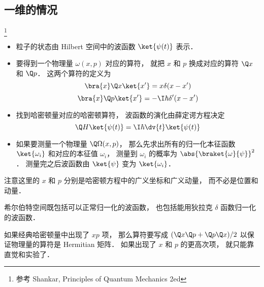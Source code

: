 


\subsection{一维的情况}
\footnote{参考 Shankar, Principles of Quantum Mechanics 2ed}

\begin{itemize}
\item 粒子的状态由 Hilbert 空间中的波函数 $\ket{\psi(t)}$ 表示．
\item 要得到一个物理量 $\omega(x, p)$ 对应的算符， 就把 $x$ 和 $p$ 换成对应的算符 $\Q x$ 和 $\Q p$． 这两个算符的定义为
\begin{equation}
\bra{x}\Q x \ket{x'} = x\delta(x-x')
\end{equation}
\begin{equation}
\bra{x}\Q p \ket{x'} = -\I\hbar \delta'(x-x')
\end{equation}
\item 找到哈密顿量对应的哈密顿算符， 波函数的演化由薛定谔方程决定
\begin{equation}
\Q H \ket{\psi(t)} = \I \hbar \dv{t} \ket{\psi(t)}
\end{equation}
\item 如果要测量一个物理量 $\Q\Omega(x, p)$， 那么先求出所有的归一化本征函数 $\ket{\omega_i}$ 和对应的本征值 $\omega_i$， 测量到 $\omega_i$ 的概率为 $\abs{\braket{\omega}{\psi}}^2$． 测量完之后波函数由 $\ket{\psi}$ 变为 $\ket{\omega_i}$．
\end{itemize}

注意这里的 $x$ 和 $p$ 分别是哈密顿方程中的广义坐标和广义动量， 而不必是位置和动量．

希尔伯特空间既包括可以正常归一化的波函数， 也包括能用狄拉克 $\delta$ 函数归一化的波函数．

如果经典哈密顿量中出现了 $xp$ 项， 那么算符要写成 $(\Q x \Q p + \Q p \Q x)/2$ 以保证物理量的算符是 Hermitian 矩阵． 如果出现了 $x$ 和 $p$ 的更高次项， 就只能靠直觉和实验了．
